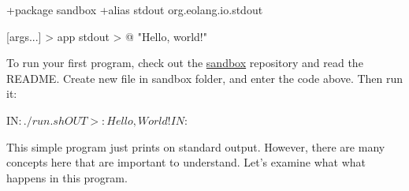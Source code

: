 \documentclass[12pt]{book}
\begin{document}
\begin{ffcode}
+package sandbox
+alias stdout org.eolang.io.stdout

[args...] > app
  stdout > @
    "Hello, world!\n"
    
\end{ffcode}

To run your first program, check out the \href{https://github.com/objectionary/sandbox}{sandbox} repository and read the README. Create new file  in sandbox folder, and enter the code above. Then run it:

\begin{ffcode}
IN$: ./run.sh
OUT>: Hello, World!
IN$: 
\end{ffcode}

This simple program just prints  on standard output. However, there are many concepts here that are important to understand. Let's examine what what happens in this program.
\end{document}
